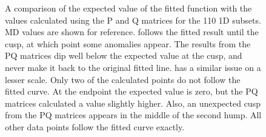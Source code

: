 \documentclass[12pt]{report}
\begin{document}
\begin{figure}[ht!]
 \centering
 
 \quad
 \caption[Comparison of the PQ matrices with the expected result for \textlangle{}110\textrangle{} 1D subset.]{\label{appfig:110PQ} A comparison of the expected value of the fitted function with the values calculated using the P and Q matrices for the \textlangle{}110\textrangle{} 1D subsets.  MD values are shown for reference.  \protect{} follows the fitted result until the cusp, at which point some anomalies appear.  The results from the PQ matrices dip well below the expected value at the cusp, and never make it back to the original fitted line. \protect{} has a similar issue on a lesser scale.  Only two of the calculated points do not follow the fitted curve.  At the endpoint the expected value is zero, but the PQ matrices calculated a value slightly higher.  Also, an unexpected cusp from the PQ matrices appears in the middle of the second hump.  All other data points follow the fitted curve exactly.}
\end{figure}
\end{document}
